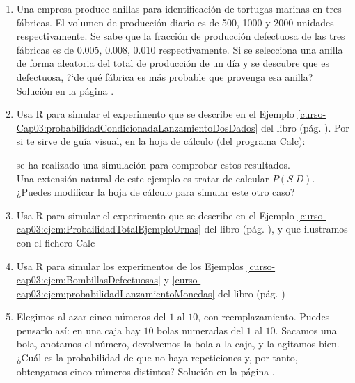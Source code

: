 \documentclass[10pt,a4paper]{article}\usepackage[]{graphicx}\usepackage[]{color}
\begin{document}
\begin{enumerate}
\item  \label{tut03:ejercicio30} Una empresa produce anillas para identificaci\'on de tortugas marinas en tres fábricas. El volumen de producci\'on diario es de 500, 1000 y 2000 unidades respectivamente. Se sabe  que la fracci\'on de producci\'on defectuosa de las tres fábricas es de 0.005, 0.008, 0.010 respectivamente. Si se selecciona una anilla de forma aleatoria del total de producci\'on de un d\'ia y se descubre que es defectuosa, ?`de qu\'e fábrica es más probable que provenga esa anilla?    
Solución en la página \pageref{tut03:ejercicio30:sol}. 


\item Usa R para simular el experimento que se describe en el Ejemplo \ref{curso-Cap03:probabilidadCondicionadaLanzamientoDosDados} del libro (pág. \pageref{curso-Cap03:probabilidadCondicionadaLanzamientoDosDados}). Por si te sirve de guía visual, en la hoja de cálculo (del programa Calc):
\begin{center} 
\end{center}
se ha realizado una simulación para comprobar estos resultados.\\
Una extensión natural de este ejemplo es tratar de calcular $P(S|D)$. ¿Puedes modificar la hoja de cálculo para simular este otro caso?

\item  Usa R para simular el experimento que se describe en el Ejemplo \ref{curso-cap03:ejem:ProbailidadTotalEjemploUrnas} del libro (pág. \pageref{curso-cap03:ejem:ProbailidadTotalEjemploUrnas}), y que ilustramos con el fichero  Calc
\begin{center}
\end{center}
\item Usa R para simular los experimentos de los Ejemplos \ref{curso-cap03:ejem:BombillasDefectuosas} y \ref{curso-cap03:ejem:probabilidadLanzamientoMonedas} del libro (pág. \pageref{curso-cap03:ejem:BombillasDefectuosas})


\item  \label{tut03:ejercicio34} Elegimos al azar cinco números del $1$ al $10$, con reemplazamiento. Puedes pensarlo así: en una caja hay $10$ bolas numeradas del $1$ al $10$. Sacamos una bola, anotamos el número, devolvemos la bola a la caja, y la agitamos bien. ¿Cuál es la probabilidad de que no haya repeticiones y, por tanto, obtengamos cinco números distintos?
Solución en la página \pageref{tut03:ejercicio34:sol}. 



\end{enumerate}
\end{document}
